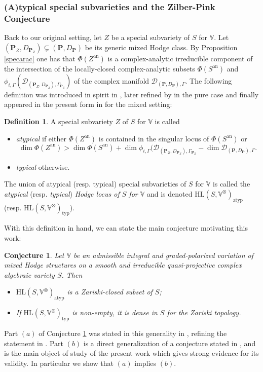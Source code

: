 \documentclass[10pt]{article}
\numberwithin{equation}{subsection}
\theoremstyle{plain}
\newtheorem{conjecture}[theorem]{Conjecture}
\theoremstyle{definition}
\newtheorem{definition}[theorem]{Definition}
\theoremstyle{remark}
\newcommand{\V}{\mathbb V}
\newcommand{\pp}{\mathbf P}
\newcommand{\HL}{\mathrm{HL}(S, \V^\otimes)}
\newcommand{\an}{\mathrm{an}}
\newcommand{\period}{\mathscr{D}}
\newcommand{\typ}{\mathrm{typ}}
\newcommand{\atyp}{\mathrm{atyp}}
\begin{document}
\subsubsection*{(A)typical special subvarieties and the Zilber-Pink Conjecture}
Back to our original setting, let $Z$ be a special subvariety of $S$ for $\V$. Let $(\pp_Z, D_{\pp_Z}) \subsetneq (\pp,D_\pp)$ be its generic mixed Hodge class. By Proposition \ref{specarac} one has that $\Phi(Z^\an)$ is a complex-analytic irreducible component of the intersection of the locally-closed complex-analytic subsets $\Phi(S^\an)$ and $\phi_{i,\Gamma}(\period_{(\pp_Z, D_{\pp_Z}), \Gamma_{\pp_Z}})$ of the complex manifold $\period_{(\pp,D_\pp), \Gamma}$. The following definition was introduced in spirit in \cite{klingler_atyp}, later refined by \cite{bku} in the pure case and finally appeared in the present form in \cite{bu} for the mixed setting:
\begin{definition}
A special subvariety $Z$ of $S$ for $\V$ is called
\begin{itemize}
\item[(a)]\textit{atypical} if either $\Phi(Z^\an)$ is contained in the singular locus of $\Phi(S^\an)$ or 
\[
\dim \Phi(Z^\an) > \dim \Phi(S^\an) + \dim \phi_{i,\Gamma}(\period_{(\pp_Z, D_{\pp_Z}), \Gamma_{\pp_Z}} - \dim\period_{(\pp,D_\pp), \Gamma}.
\]
\item[(b)] \textit{typical} otherwise.
\end{itemize}
The union of atypical (resp. typical) special subvarieties of $S$ for $\V$ is called the \textit{atypical} (resp. \textit{typical}) \textit{Hodge locus of $S$ for $\V$} and is denoted $\HL_\atyp$ (resp. $\HL_\typ$).
\end{definition}
With this definition in hand, we can state the main conjecture motivating this work:
\begin{conjecture}\label{zpconj}
Let $\V$ be an admissible integral and graded-polarized variation of mixed Hodge structures on a smooth and irreducible quasi-projective complex algebraic variety $S$. Then
\begin{itemize}
\item[(a)] $\HL_\atyp$ is a Zariski-closed subset of $S$;
\item[(b)] If $\HL_\typ$ is non-empty, it is dense in $S$ for the Zariski topology.
\end{itemize}
\end{conjecture}
Part $(a)$ of Conjecture \ref{zpconj} was stated in this generality in \cite{bu}, refining the statement in \cite{klingler_atyp}. Part $(b)$ is a direct generalization of a conjecture stated in \cite{bku}, and is the main object of study of the present work which gives strong evidence for its validity. In particular we show that $(a)$ implies $(b)$.
\end{document}
